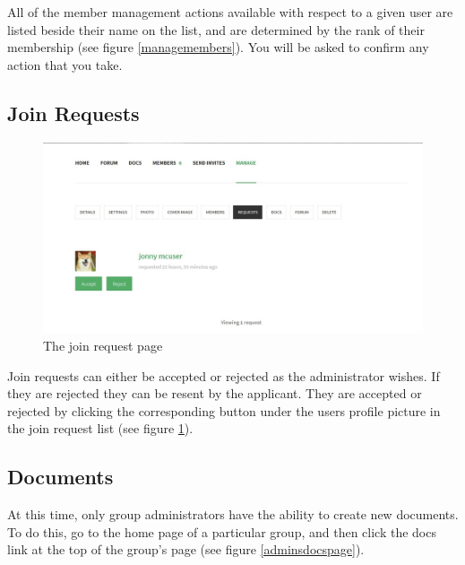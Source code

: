 \documentclass[10pt]{article}
\begin{document}
\begin{flushleft}

All of the member management actions available with respect to a given user are listed beside their name on the list, and are determined by the rank of their membership (see figure \ref{managemembers}).  You will be asked to confirm any action that you take. 

\end{flushleft}

\subsection{Join Requests}


\begin{figure}[H]
    \centering
    \includegraphics[scale=0.5]{images/memrequest.jpg}
    \caption{The join request page}
    \label{memrequest}
\end{figure}

\begin{flushleft}
Join requests can either be accepted or rejected as the administrator wishes.  If they are rejected they can be resent by the applicant.  They are accepted or rejected by clicking the corresponding button under the users profile picture in the join request list (see figure \ref{memrequest}).
\end{flushleft}


\subsection{Documents}

\begin{flushleft}
At this time, only group administrators have the ability to create new documents.  To do this, go to the home page of a particular group, and then click the docs link at the top of the group's page (see figure \ref{adminsdocspage}).
\end{flushleft}
\end{document}
